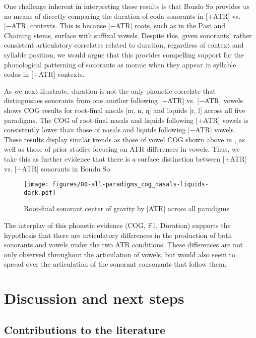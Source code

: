 \documentclass[output=paper,colorlinks,citecolor=brown]{langscibook}
\begin{document}
One challenge inherent in interpreting these results is that Bondo So provides us no means of directly comparing the duration of coda sonorants in [+ATR] vs. [−ATR] contexts. This is because [−ATR] roots, such as in the Past and Chaining stems, surface with suffixal vowels. Despite this, given sonorants' rather consistent articulatory correlates related to duration, regardless of context and syllable position, we would argue that this provides compelling support for the phonological patterning of sonorants as moraic when they appear in syllable codas in [+ATR] contexts. 

As we next illustrate, duration  is not the only phonetic correlate that distinguishes sonorants from one another following [+ATR] vs. [−ATR] vowels.  shows COG results for root-final nasals [m, n, ŋ] and liquids [r, l] across all five paradigms. The COG of root-final nasals and liquids following [+ATR] vowels is consistently lower than those of nasals and liquids following [−ATR] vowels. These results display similar trends as those of vowel COG shown above in , as well as those of prior studies focusing on ATR differences in vowels. Thus, we take this as further evidence that there is a surface distinction between [+ATR] vs. [−ATR] sonorants in Bondu So.

\begin{figure}
    \centering
    \texttt{[image: figures/80-all-paradigms\_cog\_nasals-liquids-dark.pdf]}
    \caption{Root-final sonorant center of gravity by [ATR] across all paradigms}
    \label{fig:conson-cog-all}
\end{figure}

The interplay of this phonetic  evidence (COG, F1, Duration) supports the hypothesis that there are articulatory differences in the production of both sonorants and vowels under the two ATR conditions. These differences are not only observed throughout the articulation of vowels, but would also seem to spread over the articulation of the sonorant consonants that follow them.

\section{Discussion and next steps}
\label{sec-diss}

\subsection{Contributions to the literature}
\label{subsec-contr}
\end{document}
